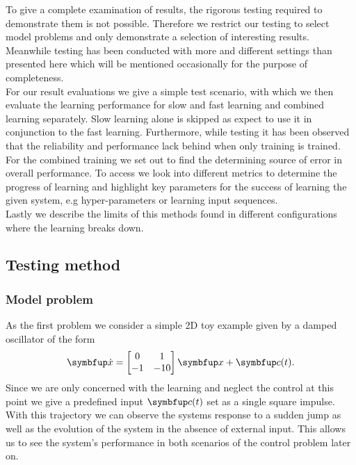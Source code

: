 To give a complete examination of results, the rigorous testing required to demonstrate them is not possible. Therefore we restrict our testing to select model problems and only demonstrate a selection of interesting results. Meanwhile testing has been conducted with more and different settings than presented here which will be mentioned occasionally for the purpose of completeness.\\
For our result evaluations we give a simple test scenario, with which we then evaluate the learning performance for slow and fast learning and combined learning separately. Slow learning alone is skipped as \cite{bourdoukan_enforcing_2015} expect to use it in conjunction to the fast learning. Furthermore, while testing it has been observed that the reliability and performance lack behind when only training is trained.\\
For the combined training we set out to find the determining  source of error in overall performance. To access we look into different metrics to determine the progress of learning and highlight key parameters for the success of learning the given system, e.g hyper-parameters or learning input sequences.\\
Lastly we describe the limits of this methods found in different configurations where the learning breaks down.

\subsection{Testing method}
\subsubsection{Model problem}
As the first problem we consider a simple 2D toy example given by a damped oscillator of the form
\begin{equation}\label{eq:toy_example}
	\bmu{\dot{x}} = \begin{bmatrix}
	0&1\\ -1 &-10
	\end{bmatrix}\bmu{x} + \bmu{c}(t).
\end{equation}
Since we are only concerned with the learning and neglect the control at this point we give a predefined input $\bmu{c}(t)$ set as a single square impulse. With this trajectory we can observe the systems response to a sudden jump as well as the evolution of the system in the absence of external input. This allows us to see the system's performance in both scenarios of the control problem later on.


